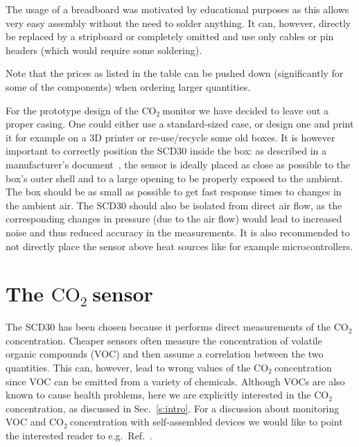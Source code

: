 \documentclass[12pt,a4paper]{article}
\newcommand{\coo}{\ensuremath{\mathrm{CO_2}~}}
\begin{document}
The usage of a breadboard was motivated by educational purposes as this allows very easy assembly without the need to solder anything. It can, however, directly be replaced by a stripboard or completely omitted and use only cables or pin headers (which would require some soldering). 

Note that the prices as listed in the table can be pushed down (significantly for some of the components) when ordering larger quantities. 

For the prototype design of the \coo monitor we have decided to leave out a proper casing. One could either use a standard-sized case, or design one and print it for example on a 3D printer or re-use/recycle some old boxes. It is however important to correctly position the SCD30 inside the box: as described in a manufacturer's document~\cite{SENSIRION2020A}, the sensor is ideally placed as close as possible to the box's outer shell and to a large opening to be properly exposed to the ambient. The box should be as small as possible to get fast response times to changes in the ambient air. The SCD30 should also be isolated from direct air flow, as the corresponding changes in pressure (due to the air flow) would lead to increased noise and thus reduced accuracy in the measurements. It is also recommended to not directly place the sensor above heat sources like for example microcontrollers.


\section{The \coo sensor}\label{s:SCD30}
The SCD30 has been chosen because it performs direct measurements of the \coo concentration. Cheaper sensors often measure the concentration of volatile organic compounds (VOC) and then assume a correlation between the two quantities. This can, however, lead to wrong values of the \coo concentration since VOC can be emitted from a variety of chemicals. Although VOCs are also known to cause health problems, here we are explicitly interested in the \coo concentration, as discussed in Sec.~\ref{s:intro}. For a discussion about monitoring VOC and \coo concentration with self-assembled devices we would like to point the interested reader 
to e.g.\ Ref.~\cite{CHIESA2019}.
\end{document}
